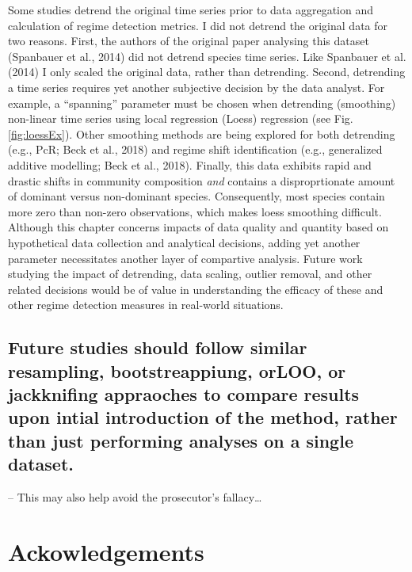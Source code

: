 \documentclass[12pt,twoside,openany]{reedthesis}
\begin{document}
Some studies detrend the original time series prior to data aggregation and calculation of regime detection metrics. I did not detrend the original data for two reasons. First, the authors of the original paper analysing this dataset (Spanbauer et al., 2014) did not detrend species time series. Like Spanbauer et al. (2014) I only scaled the original data, rather than detrending. Second, detrending a time series requires yet another subjective decision by the data analyst. For example, a ``spanning'' parameter must be chosen when detrending (smoothing) non-linear time series using local regression (Loess) regression (see Fig. \ref{fig:loessEx}). Other smoothing methods are being explored for both detrending (e.g., PcR; Beck et al., 2018) and regime shift identification (e.g., generalized additive modelling; Beck et al., 2018). Finally, this data exhibits rapid and drastic shifts in community composition \emph{and} contains a disproprtionate amount of dominant versus non-dominant species. Consequently, most species contain more zero than non-zero observations, which makes loess smoothing difficult. Although this chapter concerns impacts of data quality and quantity based on hypothetical data collection and analytical decisions, adding yet another parameter necessitates another layer of compartive analysis. Future work studying the impact of detrending, data scaling, outlier removal, and other related decisions would be of value in understanding the efficacy of these and other regime detection measures in real-world situations.

\hypertarget{future-studies-should-follow-similar-resampling-bootstreappiung-orloo-or-jackknifing-appraoches-to-compare-results-upon-intial-introduction-of-the-method-rather-than-just-performing-analyses-on-a-single-dataset.}{%
\subsection{Future studies should follow similar resampling, bootstreappiung, orLOO, or jackknifing appraoches to compare results upon intial introduction of the method, rather than just performing analyses on a single dataset.}\label{future-studies-should-follow-similar-resampling-bootstreappiung-orloo-or-jackknifing-appraoches-to-compare-results-upon-intial-introduction-of-the-method-rather-than-just-performing-analyses-on-a-single-dataset.}}

-- This may also help avoid the prosecutor's fallacy\ldots{}

\hypertarget{ackowledgements}{%
\section{Ackowledgements}\label{ackowledgements}}
\end{document}
